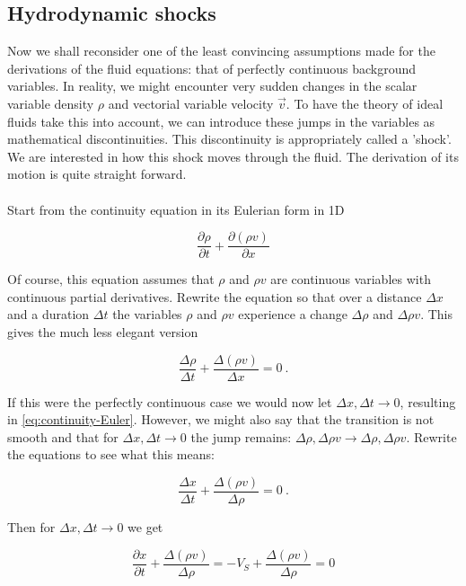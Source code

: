 \subsection{Hydrodynamic shocks}

Now we shall reconsider one of the least convincing assumptions made for the derivations of the fluid equations: that of perfectly continuous background variables. In reality, we might encounter very sudden changes in the scalar variable density $\rho$ and vectorial variable velocity $\vec{v}$. To have the theory of ideal fluids take this into account, we can introduce these jumps in the variables as mathematical discontinuities. This discontinuity is appropriately called a 'shock'. We are interested in how this shock moves through the fluid. The derivation of its motion is quite straight forward.\\
\\
Start from the continuity equation in its Eulerian form in 1D

\begin{equation}
\label{eq:continuity-Euler}
\frac{\partial \rho}{\partial t} + \frac{\partial(\rho v)}{\partial x}
\end{equation}

Of course, this equation assumes that $\rho$ and $\rho v$ are continuous variables with continuous partial derivatives. Rewrite the equation so that over a distance $\Delta x$ and a duration $\Delta t$ the variables $\rho$ and $\rho v$ experience a change $\Delta\rho$ and $\Delta \rho v$. This gives the much less elegant version 

$$ \frac{\Delta \rho}{\Delta t} + \frac{\Delta(\rho v)}{\Delta x} = 0 \ . $$

If this were the perfectly continuous case we would now let $\Delta x, \Delta t \to 0$, resulting in \autoref{eq:continuity-Euler}. However, we might also say that the transition is not smooth and that for $\Delta x, \Delta t \to 0$ the jump remains: $ \Delta \rho, \Delta \rho v \to \Delta \rho, \Delta \rho v $. Rewrite the equations to see what this means:

$$ \frac{\Delta x}{\Delta t} + \frac{\Delta(\rho v)}{\Delta \rho} = 0 \ . $$

Then for $\Delta x, \Delta t \to 0$ we get 

\begin{equation}
\label{eq:HD-shock-condition}
\frac{\partial x}{\partial t} + \frac{\Delta(\rho v)}{\Delta \rho} = -V_S + \frac{\Delta(\rho v)}{\Delta \rho} = 0
\end{equation}

